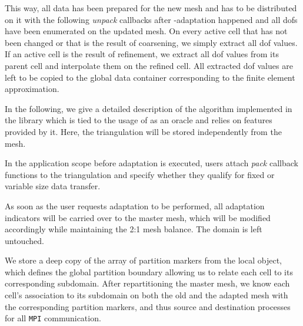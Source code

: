 This way, all data has been prepared for the new mesh and has to be distributed on it with the following \textit{unpack} callbacks after \hp-adaptation happened and all \glspl{dof} have been enumerated on the updated mesh. On every active cell that has not been changed or that is the result of coarsening, we simply extract all \gls{dof} values. If an active cell is the result of refinement, we extract all \gls{dof} values from its parent cell and interpolate them on the refined cell. All extracted \gls{dof} values are left to be copied to the global data container corresponding to the finite element approximation.

In the following, we give a detailed description of the algorithm implemented in the \dealii{} library which is tied to the usage of \pforest{} \textcite{p4est22} as an oracle and relies on features provided by it. Here, the \dealii{} triangulation will be stored independently from the \pforest{} mesh.

In the application scope before adaptation is executed, users attach \textit{pack} callback functions to the triangulation and specify whether they qualify for fixed or variable size data transfer.

As soon as the user requests adaptation to be performed, all adaptation indicators will be carried over to the \pforest{} master mesh, which will be modified accordingly while maintaining the 2:1 mesh balance. The \dealii{} domain is left untouched.

We store a deep copy of the array of partition markers \parencite{burstedde2018} from the local \pforest{} object, which defines the global partition boundary allowing us to relate each cell to its corresponding subdomain. After repartitioning the \pforest{} master mesh, we know each cell's association to its subdomain on both the old and the adapted mesh with the corresponding partition markers, and thus source and destination processes for all \texttt{MPI} communication.



